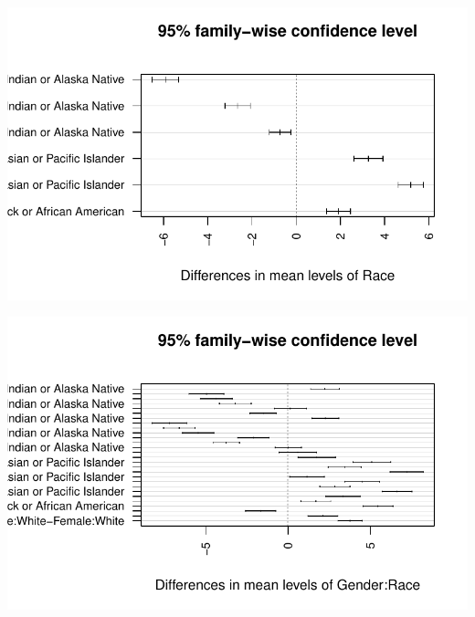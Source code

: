 \documentclass[
  letterpaper,
  DIV=11,
  numbers=noendperiod]{scrartcl}
\begin{document}
\includegraphics{Sec4_Team10_files/figure-pdf/unnamed-chunk-10-2.pdf}

\includegraphics{Sec4_Team10_files/figure-pdf/unnamed-chunk-10-3.pdf}
\end{document}
